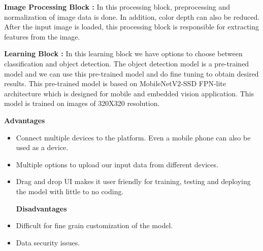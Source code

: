 \textbf{Image Processing Block : } In this processing block, preprocessing and normalization of image data is done. In addition, color depth can also be reduced. After the input image is loaded, this processing block is responsible for extracting features from the image.

\textbf{Learning Block : } In this learning block we have options to choose between classification and object detection.  The object detection model is a pre-trained model and we can use this pre-trained model and do fine tuning to obtain desired results. This pre-trained model is based on MobileNetV2-SSD FPN-lite architecture which is designed for mobile and embedded vision application. This model is trained on images of 320X320 resolution.


\textbf{Advantages }
\begin{itemize}
	\item 	Connect multiple devices to the platform. Even a mobile phone can also be used as a device.
	\item	Multiple options to upload our input data from different devices.
	\item	Drag and drop UI makes it user friendly for training, testing and deploying the model with little to no coding.
	
	\textbf{Disadvantages}
	\item	Difficult for fine grain customization of the model.
	\item	Data security issues.
	
	
\end{itemize}





